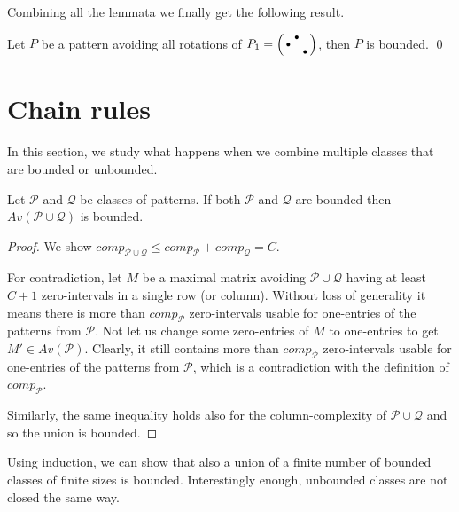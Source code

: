 Combining all the lemmata we finally get the following result.

\begin{thm}
Let $P$ be a pattern avoiding all rotations of $P_1=\left(\begin{smallmatrix} &\bullet& \\\bullet& & \\ & &\bullet\end{smallmatrix}\right)$, then $P$ is bounded. \qed
\end{thm}

\section{Chain rules}
In this section, we study what happens when we combine multiple classes that are bounded or unbounded.

\begin{thm}
\label{thm:boundunion}
Let $\mathcal{P}$ and $\mathcal{Q}$ be classes of patterns. If both $\mathcal{P}$ and $\mathcal{Q}$ are bounded then $Av(\mathcal{P}\cup\mathcal{Q})$ is bounded.
\end{thm}
\begin{proof}
We show $comp_{\mathcal{P}\cup\mathcal{Q}}\leq comp_\mathcal{P}+comp_\mathcal{Q}=C$.

For contradiction, let $M$ be a maximal matrix avoiding $\mathcal{P}\cup\mathcal{Q}$ having at least $C+1$ zero-intervals in a single row (or column). Without loss of generality it means there is more than $comp_\mathcal{P}$ zero-intervals usable for one-entries of the patterns from $\mathcal{P}$. Not let us change some zero-entries of $M$ to one-entries to get $M'\in Av(\mathcal{P})$. Clearly, it still contains more than $comp_\mathcal{P}$ zero-intervals usable for one-entries of the patterns from $\mathcal{P}$, which is a contradiction with the definition of $comp_\mathcal{P}$.

Similarly, the same inequality holds also for the column-complexity of $\mathcal{P}\cup\mathcal{Q}$ and so the union is bounded.
\end{proof}

Using induction, we can show that also a union of a finite number of bounded classes of finite sizes is bounded. Interestingly enough, unbounded classes are not closed the same way.

